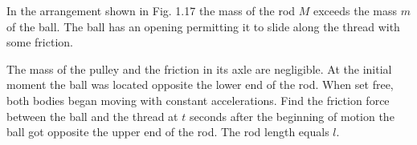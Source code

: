 \item In the arrangement shown in Fig. 1.17 the mass of the rod \( M \) exceeds the mass \( m \) of the ball. The ball has an opening permitting it to slide along the thread with some friction. 
    \begin{center}
    \end{center}
    The mass of the pulley and the friction in its axle are negligible. At the initial moment the ball was located opposite the lower end of the rod. When set free, both bodies began moving with constant accelerations. Find the friction force between the ball and the thread at \( t \) seconds after the beginning of motion the ball got opposite the upper end of the rod. The rod length equals \( l \).